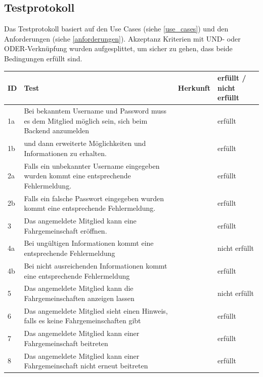 \subsection{Testprotokoll}
Das Testprotokoll basiert auf den Use Cases (siehe \ref{use_cases}) und den Anforderungen (siehe \ref{anforderungen}). Akzeptanz Kriterien mit UND- oder ODER-Verknüpfung wurden aufgesplittet, um sicher zu gehen, dass beide Bedingungen erfüllt sind.

\begin{longtable}{ l | p{7cm} | l | l }

	\hline
	\rowcolor{gray}
	ID	&	Test			&	Herkunft			&	erfüllt / nicht erfüllt\\ \hline
	1a	&	Bei bekanntem Username und Password muss es dem Mitglied möglich sein, sich beim Backend anzumelden			
				&	\nameref{table:req_1} 	&	erfüllt\\ \hline
	1b	&	und dann erweiterte Möglichkeiten und Informationen zu erhalten.
				&	\nameref{table:req_1} 	&	erfüllt\\ \hline
	2a	&	Falls ein unbekannter Username eingegeben wurden kommt eine entsprechende Fehlermeldung.			
				&	\nameref{table:req_1} 	&	erfüllt\\ \hline
	2b	&	Falls ein falsche Passwort eingegeben wurden kommt eine entsprechende Fehlermeldung.			
				&	\nameref{table:req_1} 	&	erfüllt\\ \hline
	3	&	Das angemeldete Mitglied kann eine Fahrgemeinschaft eröffnen.		
				&	\nameref{table:req_2} 	&	erfüllt\\ \hline
	4a	&	Bei ungültigen Informationen kommt eine entsprechende Fehlermeldung
				&	\nameref{table:req_2} 	&	nicht erfüllt\\ \hline
	4b	&	Bei nicht ausreichenden Informationen kommt eine entsprechende Fehlermeldung
				&	\nameref{table:req_2} 	&	erfüllt\\ \hline
	5	&	Das angemeldete Mitglied kann die Fahrgemeinschaften anzeigen lassen
				&	\nameref{table:req_3} 	&	nicht erfüllt\\ \hline
	6	&	Das angemeldete Mitglied sieht einen Hinweis, falls es keine Fahrgemeinschaften gibt
				&	\nameref{table:req_3} 	&	erfüllt\\ \hline
	7	&	Das angemeldete Mitglied kann einer Fahrgemeinschaft beitreten
				&	\nameref{table:req_4} 	&	erfüllt\\ \hline
	8	&	Das angemeldete Mitglied kann einer Fahrgemeinschaft nicht erneut beitreten
				&	\nameref{table:req_4} 	&	erfüllt\\ \hline

\end{longtable}
